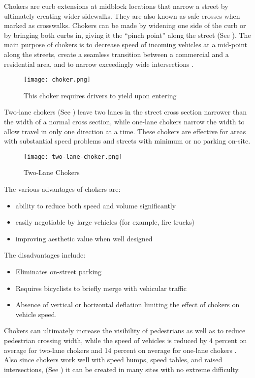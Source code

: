 Chokers are curb extensions at midblock locations that narrow a street by ultimately creating wider sidewalks. They are also known as safe crosses when marked as crosswalks. Chokers can be made by widening one side of the curb or by bringing both curbs in, giving it the “pinch point” along the street (See ). The main purpose of chokers is to decrease speed of incoming vehicles at a mid-point along the streets, create a seamless transition between a commercial and a residential area, and to narrow exceedingly wide intersections \cite{walking-info-chokers}.

\begin{figure}[h]
\centering
\texttt{[image: choker.png]}
\caption{This choker requires drivers to yield upon entering}\label{fig:choker}
\end{figure}

Two-lane chokers (See ) leave two lanes in the street cross section narrower than the width of a normal cross section, while one-lane chokers narrow the width to allow travel in only one direction at a time. These chokers are effective for areas with substantial speed problems and streets with minimum or no parking on-site.

\begin{figure}
\centering
\texttt{[image: two-lane-choker.png]}
\caption{Two-Lane Chokers}\label{fig:two-lane-choker}
\end{figure}

The various advantages of chokers are:\begin{itemize}
\item ability to reduce both speed and volume significantly
\item easily negotiable by large vehicles (for example, fire trucks)
\item improving aesthetic value when well designed
\end{itemize}

The disadvantages include:\begin{itemize}
\item Eliminates on-street parking
\item Requires bicyclists to briefly merge with vehicular traffic
\item Absence of vertical or horizontal deflation limiting the effect of chokers on vehicle speed.
\end{itemize}

Chokers can ultimately increase the visibility of pedestrians as well as to reduce pedestrian crossing width, while the speed of vehicles is reduced by 4 percent on average for two-lane chokers and 14 percent on average for one-lane chokers \cite{ite}. Also since chokers work well with speed humps, speed tables, and raised intersections, (See ) it can be created in many sites with no extreme difficulty.

